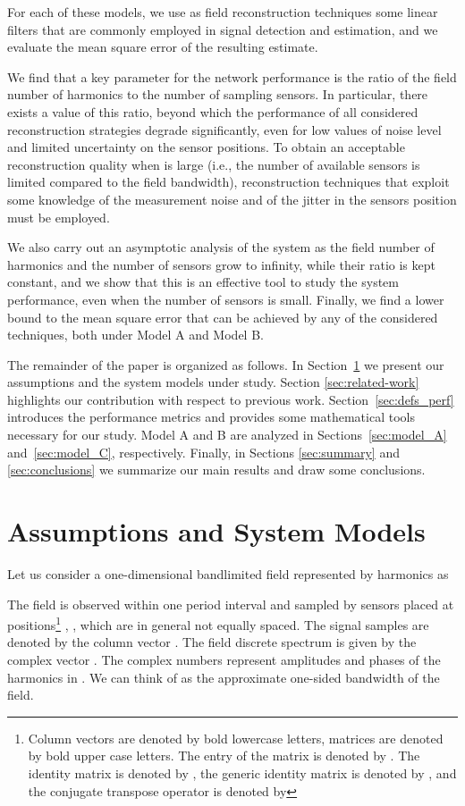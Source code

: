 \documentclass[final, a4paper]{IEEEtran}
\begin{document}
For each of these models, we use as field
reconstruction techniques some linear filters that are commonly
employed in signal detection and estimation, and we evaluate the
mean square error of the resulting estimate.

We find that a key parameter for the network performance is the
ratio  of  the field number of harmonics to the number of sampling
sensors. In particular, there exists a value of this ratio,
beyond which the performance of all considered reconstruction
strategies degrade significantly, even for low values of noise level
and limited uncertainty on the sensor positions. To obtain an
acceptable reconstruction quality when  is large (i.e., the
number of available sensors is limited compared to the field
bandwidth), reconstruction techniques that exploit some knowledge of
the measurement noise and of the jitter in the sensors position must be employed.

We also carry out an asymptotic analysis of the system as the field
number of harmonics and the number of sensors grow to infinity, while their
ratio  is kept constant, and we show that this is an
effective tool to study the system performance, even when the number
of sensors is small. Finally, we find a lower bound to the mean
square error that can be achieved by any of the considered
techniques, both under Model A and Model B.

The remainder of the paper is organized as follows.
In Section~\ref{sec:system_model} we present our assumptions and
the system models under study. Section \ref{sec:related-work}
highlights our contribution with respect to previous work.
Section~\ref{sec:defs_perf} introduces the performance metrics and
provides some mathematical tools necessary for our study. Model A
and B are analyzed in Sections~\ref{sec:model_A}
and~\ref{sec:model_C}, respectively.
Finally, in Sections \ref{sec:summary} and \ref{sec:conclusions} we summarize our main results and
draw some conclusions.


\section{Assumptions and System Models}
\label{sec:system_model}

Let us consider a one-dimensional bandlimited field
 represented by  harmonics as

The field is observed within one period interval  and sampled by  sensors
placed at positions\footnote{Column vectors are denoted by bold lowercase
letters, matrices are denoted by bold upper case letters. The
 entry of the matrix  is denoted by . The
 identity matrix is denoted by , the generic
identity matrix is denoted by , and the conjugate transpose
operator is denoted by }
, , 
which are in general not equally spaced.
The signal samples are denoted by the column vector .
The field discrete spectrum is given by the  complex
vector . The complex numbers  represent amplitudes and phases
of the harmonics in . We can think of  as the approximate one-sided bandwidth of the field.
\end{document}
